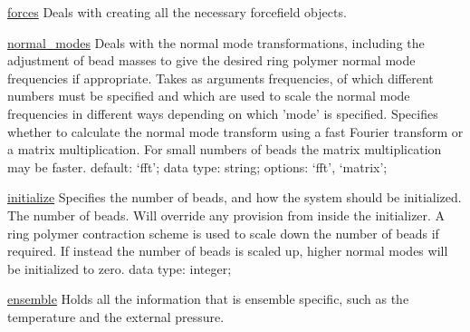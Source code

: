 \begin{ipifield}{}
\begin{ipifield}{\hyperref[FORCES]{forces}}%
{Deals with creating all the necessary forcefield objects.}%
{}%
{}
\end{ipifield}
\begin{ipifield}{\hyperref[NORMALMODES]{normal\_modes}}%
{Deals with the normal mode transformations, including the adjustment of bead masses to give the desired ring polymer normal mode frequencies if appropriate. Takes as arguments frequencies, of which different numbers must be specified and which are used to scale the normal mode frequencies in different ways depending on which 'mode' is specified.}%
{}%
{%
{Specifies whether to calculate the normal mode transform using a fast Fourier transform or a matrix multiplication. For small numbers of beads the matrix multiplication may be faster.}%
{default: `fft'; data type: string; options: `fft', `matrix'; }%
}
\end{ipifield}
\begin{ipifield}{\hyperref[INITIALIZER]{initialize}}%
{Specifies the number of beads, and how the system should be initialized.}%
{}%
{%
{The number of beads. Will override any provision from inside the initializer. A ring polymer contraction scheme is used to scale down the number of beads if required. If instead the number of beads is scaled up, higher normal modes will be initialized to zero.}%
{data type: integer; }%
}
\end{ipifield}
\begin{ipifield}{\hyperref[ENSEMBLE]{ensemble}}%
{Holds all the information that is ensemble specific, such as the temperature and the external pressure.}%
{}%
{}
\end{ipifield}
\end{ipifield}
